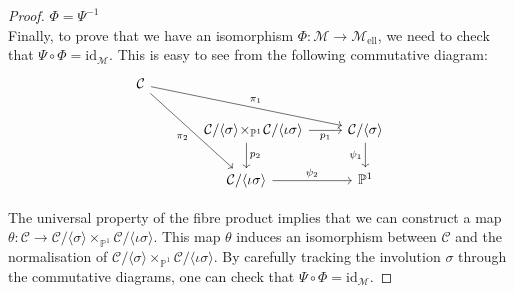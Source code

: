 \documentclass[10pt,a4paper]{amsart}
\newcommand{\calC}{\mathcal{C}}
\newcommand{\calM}{\mathcal{M}}
\newcommand{\mell}{\mathcal{M}_{\text{ell}}}
\begin{document}
\begin{proof}
\underline{$\Phi=\Psi^{-1}$}\\

Finally, to prove that we have an isomorphism $\Phi:\calM\rightarrow\mell$, we need to check that $\Psi\circ\Phi=\mathrm{id}_{\calM}$. This is easy to see from the following commutative diagram:
\[\begin{tikzcd}
\calC \arrow[rrd, "\pi_1"] \arrow[rdd, "\pi_2"'] &                                                                                                                   &                                                 \\
                                                 & \quad\calC/\langle\sigma\rangle\!\times_{\mathbb{P}^1}\!\calC/\langle\iota\sigma\rangle \arrow[r, "p_1"'] \arrow[d, "p_2"] & \calC/\langle\sigma\rangle \arrow[d, "\psi_1"'] \\
                                                 &\calC/\langle\iota\sigma\rangle \arrow[r, "\psi_2"]                                                               & \mathbb{P}^1                                   
\end{tikzcd}\]

The universal property of the fibre product implies that we can construct a map $\theta:\calC\rightarrow\calC/\langle\sigma\rangle\times_{\mathbb{P}^1}\calC/\langle\iota\sigma\rangle$. This map $\theta$ induces an isomorphism between $\calC$ and the normalisation of $\calC/\langle\sigma\rangle\times_{\mathbb{P}^1}\calC/\langle\iota\sigma\rangle$. By carefully tracking the involution $\sigma$ through the commutative diagrams, one can check that $\Psi\circ\Phi=\mathrm{id}_{\calM}$.
\end{proof}
\end{document}
